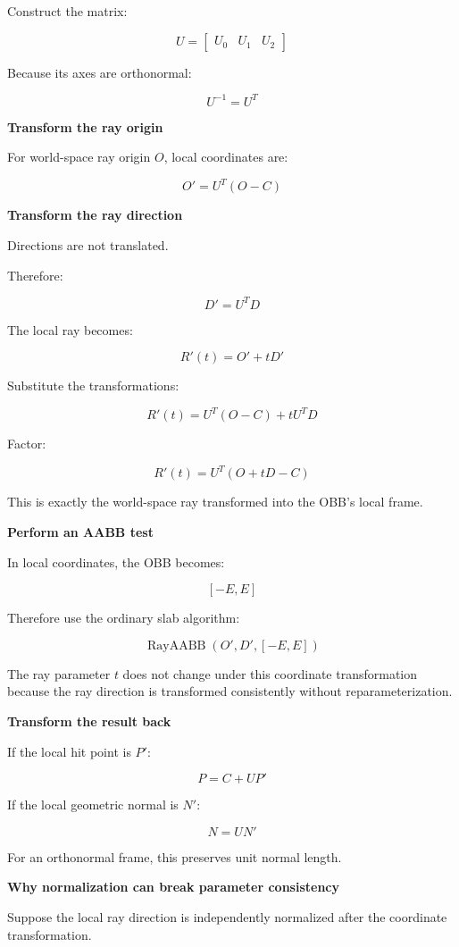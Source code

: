 Construct the matrix:

\[
U= \begin{bmatrix} U_0&U_1&U_2 \end{bmatrix}
\]

Because its axes are orthonormal:

\[
U^{-1}=U^T
\]

\textbf{Transform the ray origin}

For world-space ray origin \(O\), local coordinates are:

\[
\boxed{ O'=U^T(O-C) }
\]

\textbf{Transform the ray direction}

Directions are not translated.

Therefore:

\[
\boxed{ D'=U^TD }
\]

The local ray becomes:

\[
R'(t)=O'+tD'
\]

Substitute the transformations:

\[
R'(t)=U^T(O-C)+tU^TD
\]

Factor:

\[
R'(t)=U^T(O+tD-C)
\]

This is exactly the world-space ray transformed into the OBB's local frame.

\textbf{Perform an AABB test}

In local coordinates, the OBB becomes:

\[
[-E,E]
\]

Therefore use the ordinary slab algorithm:

\[
\operatorname{RayAABB}(O',D',[-E,E])
\]

The ray parameter \(t\) does not change under this coordinate transformation because the ray direction is transformed consistently without reparameterization.

\textbf{Transform the result back}

If the local hit point is \(P'\):

\[
\boxed{ P=C+UP' }
\]

If the local geometric normal is \(N'\):

\[
\boxed{ N=UN' }
\]

For an orthonormal frame, this preserves unit normal length.

\textbf{Why normalization can break parameter consistency}

Suppose the local ray direction is independently normalized after the coordinate transformation.

